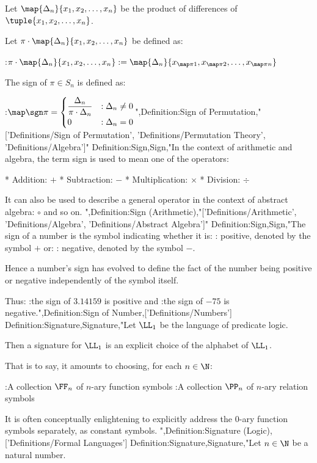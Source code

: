 Let $\map {\Delta_n} {x_1, x_2, \ldots, x_n}$ be the product of differences of $\tuple {x_1, x_2, \ldots, x_n}$.

Let $\pi \cdot \map {\Delta_n} {x_1, x_2, \ldots, x_n}$ be defined as:

:$\pi \cdot \map {\Delta_n} {x_1, x_2, \ldots, x_n} := \map {\Delta_n} {x_{\map \pi 1}, x_{\map \pi 2}, \ldots, x_{\map \pi n} }$


The sign of $\pi \in S_n$ is defined as:

:$\map \sgn \pi = \begin {cases}
\dfrac {\Delta_n} {\pi \cdot \Delta_n} & : \Delta_n \ne 0 \\
0 & : \Delta_n = 0 \end {cases}$",Definition:Sign of Permutation,"['Definitions/Sign of Permutation', 'Definitions/Permutation Theory', 'Definitions/Algebra']"
Definition:Sign,Sign,"In the context of arithmetic and algebra, the term sign is used to mean one of the operators:

* Addition: $+$
* Subtraction: $-$
* Multiplication: $\times$
* Division: $\div$

It can also be used to describe a general operator in the context of abstract algebra: $\circ$ and so on.
",Definition:Sign (Arithmetic),"['Definitions/Arithmetic', 'Definitions/Algebra', 'Definitions/Abstract Algebra']"
Definition:Sign,Sign,"The sign of a number is the symbol indicating whether it is:
: positive, denoted by the symbol $+$
or:
: negative, denoted by the symbol $-$.


Hence a number's sign has evolved to define the fact of the number being positive or negative independently of the symbol itself.


Thus:
:the sign of $3.14159$ is positive
and
:the sign of $-75$ is negative.",Definition:Sign of Number,['Definitions/Numbers']
Definition:Signature,Signature,"Let $\LL_1$ be the language of predicate logic.


Then a signature for $\LL_1$ is an explicit choice of the alphabet of $\LL_1$.

That is to say, it amounts to choosing, for each $n \in \N$:

:A collection $\FF_n$ of $n$-ary function symbols
:A collection $\PP_n$ of $n$-ary relation symbols

It is often conceptually enlightening to explicitly address the $0$-ary function symbols separately, as constant symbols.
",Definition:Signature (Logic),['Definitions/Formal Languages']
Definition:Signature,Signature,"Let $n \in \N$ be a natural number.

